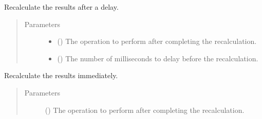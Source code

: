 \documentclass[letterpaper,10pt,english]{sphinxmanual}
\begin{document}
\begin{fulllineitems}
\begin{fulllineitems}
\label{\detokenize{tyche:tyche.DecisionGUI.DecisionWindow.reevaluate}}
Recalculate the results after a delay.
\begin{quote}\begin{description}
\item[{Parameters}] \leavevmode\begin{itemize}
\item {} 
 () \textendash{} The operation to perform after completing the recalculation.

\item {} 
 () \textendash{} The number of milliseconds to delay before the recalculation.

\end{itemize}

\end{description}\end{quote}

\end{fulllineitems}


\begin{fulllineitems}
\label{\detokenize{tyche:tyche.DecisionGUI.DecisionWindow.reevaluate_immediate}}
Recalculate the results immediately.
\begin{quote}\begin{description}
\item[{Parameters}] \leavevmode
{} () \textendash{} The operation to perform after completing the recalculation.

\end{description}\end{quote}


\end{fulllineitems}
\end{fulllineitems}
\end{document}

